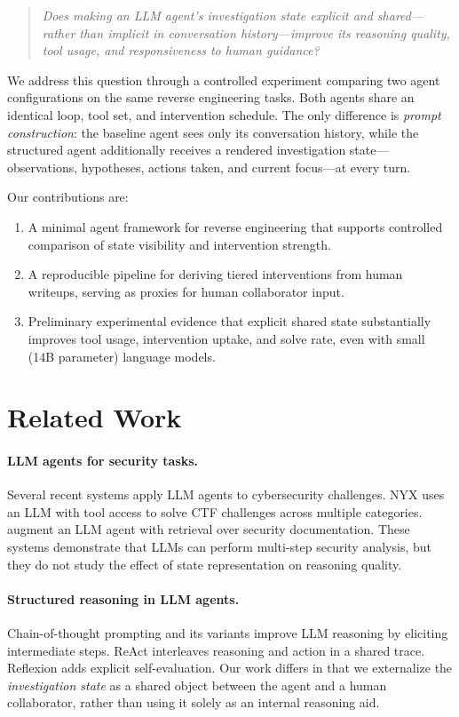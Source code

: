 \documentclass[letterpaper]{article}
\begin{document}
\begin{quote}
\emph{Does making an LLM agent's investigation state explicit and shared---rather than implicit in conversation history---improve its reasoning quality, tool usage, and responsiveness to human guidance?}
\end{quote}

We address this question through a controlled experiment comparing two agent configurations on the same reverse engineering tasks.
Both agents share an identical loop, tool set, and intervention schedule.
The only difference is \emph{prompt construction}: the baseline agent sees only its conversation history, while the structured agent additionally receives a rendered investigation state---observations, hypotheses, actions taken, and current focus---at every turn.

Our contributions are:
\begin{enumerate}
    \item A minimal agent framework for reverse engineering that supports controlled comparison of state visibility and intervention strength.
    \item A reproducible pipeline for deriving tiered interventions from human writeups, serving as proxies for human collaborator input.
    \item Preliminary experimental evidence that explicit shared state substantially improves tool usage, intervention uptake, and solve rate, even with small (14B parameter) language models.
\end{enumerate}

\section{Related Work}

\paragraph{LLM agents for security tasks.}
Several recent systems apply LLM agents to cybersecurity challenges.
NYX \citep{shao2024nyx} uses an LLM with tool access to solve CTF challenges across multiple categories.
\citet{yang2024rag} augment an LLM agent with retrieval over security documentation.
These systems demonstrate that LLMs can perform multi-step security analysis, but they do not study the effect of state representation on reasoning quality.

\paragraph{Structured reasoning in LLM agents.}
Chain-of-thought prompting \citep{wei2022chain} and its variants improve LLM reasoning by eliciting intermediate steps.
ReAct \citep{yao2023react} interleaves reasoning and action in a shared trace.
Reflexion \citep{shinn2023reflexion} adds explicit self-evaluation.
Our work differs in that we externalize the \emph{investigation state} as a shared object between the agent and a human collaborator, rather than using it solely as an internal reasoning aid.
\end{document}
